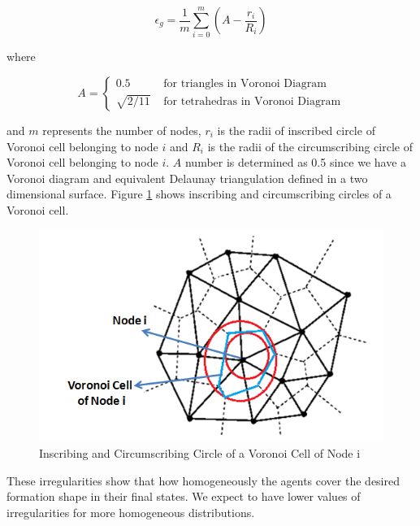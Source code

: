 \begin{equation}
\epsilon _g = \frac{1}{m} \sum_{i = 0}^{m} (A-\frac{r_i}{R_i})
\end{equation}

where
 
\begin{equation}
A = \left\{ \begin{array}{rl}
0.5                               &\mbox{ for triangles in Voronoi Diagram} \\
\sqrt{2/11}                   &\mbox{ for tetrahedras in Voronoi Diagram}
\end{array} \right.
\end{equation}
		
and $m$ represents the number of nodes, $r_i$ is the radii of inscribed circle of Voronoi cell belonging to node $i$ and $R_i$ is the radii of the circumscribing circle of Voronoi cell belonging to node $i$. $A$ number is determined as 0.5 since we have a Voronoi diagram and equivalent Delaunay triangulation defined in a two dimensional surface. Figure \ref{inscribe_circumscribe} shows inscribing and circumscribing circles of a Voronoi cell.
	
\begin{figure}[H]
\caption{Inscribing and Circumscribing Circle of a Voronoi Cell of Node i} \label{inscribe_circumscribe}
\centering
\includegraphics[scale = 0.70]{voronoi2}
\end{figure}

These irregularities show that how homogeneously the agents cover the desired formation shape in their final states. We expect to have lower values of irregularities for more homogeneous distributions. 

